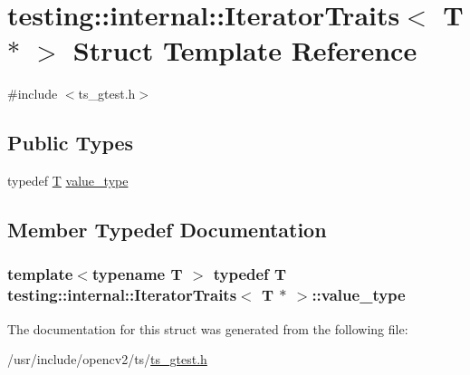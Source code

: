 \hypertarget{structtesting_1_1internal_1_1IteratorTraits_3_01T_01_5_01_4}{\section{testing\-:\-:internal\-:\-:Iterator\-Traits$<$ T $\ast$ $>$ Struct Template Reference}
\label{structtesting_1_1internal_1_1IteratorTraits_3_01T_01_5_01_4}
}


{\ttfamily \#include $<$ts\-\_\-gtest.\-h$>$}

\subsection*{Public Types}
\begin{DoxyCompactItemize}
\item 
typedef \hyperlink{calib3d_8hpp_a3efb9551a871ddd0463079a808916717}{T} \hyperlink{structtesting_1_1internal_1_1IteratorTraits_3_01T_01_5_01_4_a7e46869ed36cc5aea898e243d270a8be}{value\-\_\-type}
\end{DoxyCompactItemize}


\subsection{Member Typedef Documentation}
\hypertarget{structtesting_1_1internal_1_1IteratorTraits_3_01T_01_5_01_4_a7e46869ed36cc5aea898e243d270a8be}{
\subsubsection[{value\-\_\-type}]{\setlength{\rightskip}{0pt plus 5cm}template$<$typename T $>$ typedef {\bf T} {\bf testing\-::internal\-::\-Iterator\-Traits}$<$ {\bf T} $\ast$ $>$\-::{\bf value\-\_\-type}}}\label{structtesting_1_1internal_1_1IteratorTraits_3_01T_01_5_01_4_a7e46869ed36cc5aea898e243d270a8be}


The documentation for this struct was generated from the following file\-:\begin{DoxyCompactItemize}
\item 
/usr/include/opencv2/ts/\hyperlink{ts__gtest_8h}{ts\-\_\-gtest.\-h}\end{DoxyCompactItemize}
